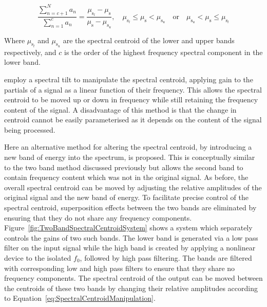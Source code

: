 			\begin{equation}
				\frac{\sum_{n = c + 1}^{N} a_{n}}
				     {{\sum_{n = 1}^{c} a_{n}}} = 
				\frac{\mu_{\mathrm{s}_{l}} - \mu_{\mathrm{s}}}{\mu_{\mathrm{s}} - \mu_{\mathrm{s}_{u}}}, 
				\quad \mu_{\mathrm{s}_{l}} \leq \mu_{\mathrm{s}} < \mu_{\mathrm{s}_{u}} \quad \text{or} 
					\quad \mu_{\mathrm{s}_{u}} < \mu_{\mathrm{s}} \leq \mu_{\mathrm{s}_{l}}
				\label{eq:SpectralCentroidManipulation}
			\end{equation}

			Where $\mu_{\mathrm{s}_{l}}$ and $\mu_{\mathrm{s}_{u}}$ are the spectral centroid of the lower and
			upper bands respectively, and $c$ is the order of the highest frequency spectral component in the
			lower band.

			\citet{williams2007perceptually} employ a spectral tilt to manipulate the spectral centroid,
			applying gain to the partials of a signal as a linear function of their frequency. This allows the
			spectral centroid to be moved up or down in frequency while still retaining the frequency content
			of the signal. A disadvantage of this method is that the change in centroid cannot be easily
			parameterised as it depends on the content of the signal being processed.

			Here an alternative method for altering the spectral centroid, by introducing a new band of energy
			into the spectrum, is proposed. This is conceptually similar to the two band method discussed
			previously but allows the second band to contain frequency content which was not in the original
			signal. As before, the overall spectral centroid can be moved by adjusting the relative amplitudes
			of the original signal and the new band of energy. To facilitate precise control of the spectral
			centroid, superposition effects between the two bands are eliminated by ensuring that they do not
			share any frequency components.  Figure~\ref{fig:TwoBandSpectralCentroidSystem} shows a system
			which separately controls the gains of two such bands. The lower band is generated via a low pass
			filter on the input signal while the high band is created by applying a nonlinear device to the
			isolated $f_{0}$, followed by high pass filtering. The bands are filtered with corresponding low
			and high pass filters to ensure that they share no frequency components. The spectral centroid of
			the output can be moved between the centroids of these two bands by changing their relative
			amplitudes according to Equation~\ref{eq:SpectralCentroidManipulation}.

